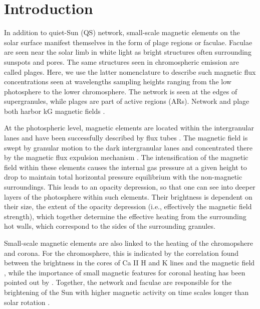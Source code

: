 \documentclass[goettingen, gauss, print]{thesis}
\begin{document}
  \newpage
\section{Introduction}
In addition to quiet-Sun (QS) network, small-scale magnetic elements on the solar surface manifest themselves in the form of plage regions or faculae. 
Faculae are seen near the solar limb in white light as bright structures often surrounding sunspots and pores. The same structures seen in chromospheric emission are called plages. Here, we use the latter nomenclature to describe such magnetic flux concentrations seen at wavelengths sampling heights ranging from the low photosphere to the lower chromosphere. The network is seen at the edges of supergranules, while plages are part of active regions (ARs). Network and plage both harbor kG magnetic fields \citep{stenflo_magnetic-field_1973}.

At the photospheric level, magnetic elements are located within the intergranular lanes and have been successfully described by flux tubes \citep{spruit_pressure_1976, solanki_small-scale_1993}. The magnetic field is swept by granular motion to the dark intergranular lanes and concentrated there by the magnetic flux expulsion mechanism \citep{parker_kinematical_1963}. The intensification of the magnetic field within these elements causes the internal gas pressure at a given height to drop to maintain total horizontal pressure equilibrium with the non-magnetic surroundings. This leads to an opacity depression, so that one can see into deeper layers of the photosphere within such elements. Their brightness is dependent on their size, the extent of the opacity depression (i.e., effectively the magnetic field strength), which together determine the effective heating from the surrounding hot walls, which correspond to the sides of the surrounding granules.

Small-scale magnetic elements are also linked to the heating of the chromopshere and corona. For the chromosphere, this is indicated by the correlation found between the brightness in the cores of Ca II H and K lines and the magnetic field \citep[]{skumanich_statistical_1975,schrijver_relations_1989,ortiz_how_2005,rezaei_relation_2007,loukitcheva_relationship_2009,kahil_brightness_2017}, while the importance of small magnetic features for coronal heating has been pointed out by \cite{zhang_lifetime_1998,ishikawa_comparison_2009, zhou_solar_2010,chitta_solar_2017}. Together, the network and faculae are responsible for the brightening of the Sun with higher magnetic activity on time scales longer than solar rotation \citep{krivova_reconstruction_2003,yeo_solar_2017}. 
\end{document}
